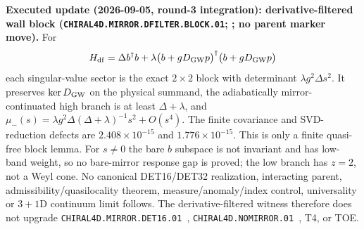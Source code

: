 \par\smallskip\noindent\textbf{Executed update (2026-09-05, round-3 integration):
derivative-filtered wall block
(\texttt{CHIRAL4D.MIRROR.DFILTER.BLOCK.01};
; no parent
marker move).}
For
\[
 H_{\rm df}=\Delta b^\dagger b+
 \lambda\bigl(b+gD_{\rm GW}p\bigr)^\dagger
              \bigl(b+gD_{\rm GW}p\bigr)
\]
each singular-value sector is the exact $2{\times}2$ block with determinant
$\lambda g^2\Delta s^2$.  It preserves $\ker D_{\rm GW}$ on the physical summand,
the adiabatically mirror-continuated high branch is at least $\Delta+\lambda$, and
\(
 \mu_-(s)=\lambda g^2\Delta(\Delta+\lambda)^{-1}s^2+O(s^4).
\)
The finite covariance and SVD-reduction defects are
$2.408{\times}10^{-15}$ and $1.776{\times}10^{-15}$.  This is only a finite
quasi-free block lemma.  For $s\ne0$ the bare $b$ subspace is not invariant and has
low-band weight, so no bare-mirror response gap is proved; the low branch has
$z=2$, not a Weyl cone.  No canonical DET16/DET32 realization, interacting parent,
admissibility/quasilocality theorem, measure/anomaly/index control, universality or
$3{+}1$D continuum limit follows.  The derivative-filtered witness therefore does
not upgrade \texttt{CHIRAL4D.MIRROR.DET16.01}~\mC,
\texttt{CHIRAL4D.NOMIRROR.01}~\mO, T4, or TOE.

